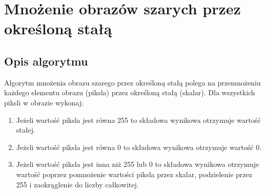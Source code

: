 \documentclass[a4paper,12pt, titlepage]{report}
\begin{document}
\section{Mnożenie obrazów szarych przez określoną stałą}
\subsection*{Opis algorytmu}
\par Algorytm mnożenia obrazu szarego przez określoną stałą polega na przemnożeniu każdego elementu obrazu (piksla) przez określoną stałą (skalar). Dla wszystkich piksli w obrazie wykonaj:
\begin{enumerate}
\item Jeżeli wartość piksla jest równa 255 to składowa wynikowa otrzymuje wartość stałej.
\item Jeżeli wartość piksla jest równa 0 to składowa wynikowa otrzymuje wartość 0.
\item Jeżeli wartość piksla jest inna niż 255 lub 0 to składowa wynikowa otrzymuje wartość poprzez pomnożenie wartości piksla przez skalar, podzielenie przez 255 i zaokrąglenie do liczby całkowitej.
\end{enumerate}
\end{document}
